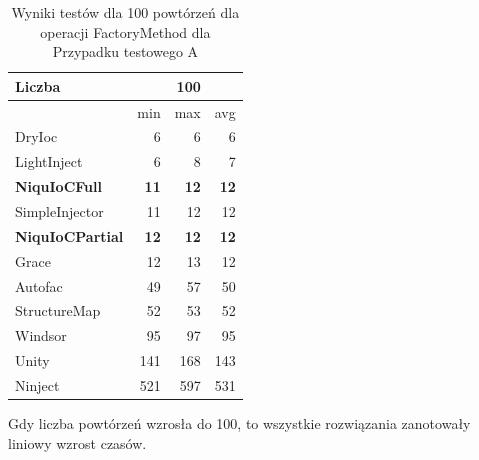 \documentclass[12pt]{article}
\begin{document}
\begin{table}[H]
\captionsetup{belowskip=0pt,aboveskip=0pt}
\begin{center}
\begin{small}
	\begin{tabular}{ | l | r r r | }
    		\hline
Liczba & & 100 & \\ \hline
 & min & max & avg \\ \hline
DryIoc & 6 & 6 & 6 \\ \hline
LightInject & 6 & 8 & 7 \\ \hline
\textbf{NiquIoCFull} & \textbf{11} & \textbf{12} & \textbf{12} \\ \hline
SimpleInjector & 11 & 12 & 12 \\ \hline
\textbf{NiquIoCPartial} & \textbf{12} & \textbf{12} & \textbf{12} \\ \hline
Grace & 12 & 13 & 12 \\ \hline
Autofac & 49 & 57 & 50 \\ \hline
StructureMap & 52 & 53 & 52 \\ \hline
Windsor & 95 & 97 & 95 \\ \hline
Unity & 141 & 168 & 143 \\ \hline
Ninject & 521 & 597 & 531 \\ \hline
  	\end{tabular}
\end{small}
\end{center}
\caption{Wyniki testów dla 100 powtórzeń dla operacji FactoryMethod dla Przypadku testowego A}
\label{TestCaseA_FactoryMethod100}
\end{table}
Gdy liczba powtórzeń wzrosła do 100, to wszystkie rozwiązania zanotowały liniowy wzrost czasów.
\\ \\
\end{document}
